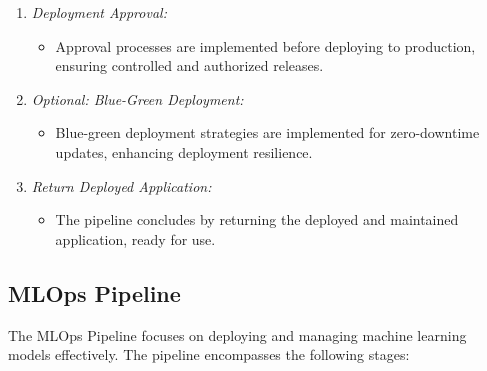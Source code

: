\documentclass[12pt, letterpaper]{article}
\begin{document}
\begin{enumerate}
    \item \textit{Deployment Approval:}
    \begin{itemize}
        \item Approval processes are implemented before deploying to production, ensuring controlled and authorized releases.
    \end{itemize}
    
    \item \textit{Optional: Blue-Green Deployment:}
    \begin{itemize}
        \item Blue-green deployment strategies are implemented for zero-downtime updates, enhancing deployment resilience.
    \end{itemize}
    
    \item \textit{Return Deployed Application:}
    \begin{itemize}
        \item The pipeline concludes by returning the deployed and maintained application, ready for use.
    \end{itemize}
\end{enumerate}

\subsection*{MLOps Pipeline}

The MLOps Pipeline focuses on deploying and managing machine learning models effectively. The pipeline encompasses the following stages:
\end{document}
